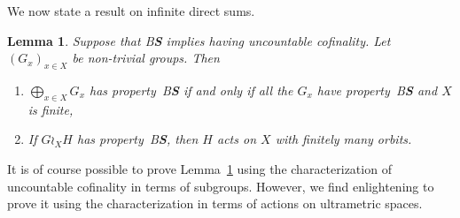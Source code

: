 \documentclass[a4paper]{article}
\newtheorem{lem}{Lemma}[section]
\theoremstyle{definition}
\newcommand*{\BS}{B\textbf{S}}
\begin{document}
We now state a result on infinite direct sums.
%
%
\begin{lem}\label{Lemma:Cof}
Suppose that \BS{} implies having uncountable cofinality.
Let $(G_x)_{x\in X}$ be non-trivial groups. Then
\begin{enumerate}
\item $\bigoplus_{x\in X}G_x$ has property~\BS{} if and only if all the $G_x$ have property~\BS{} and $X$ is finite,
\item If $G\wr_XH$ has property~\BS, then $H$ acts on $X$ with finitely many orbits.
\end{enumerate}
\end{lem}
%
%
It is of course possible to prove Lemma~\ref{Lemma:Cof} using the characterization of uncountable cofinality in terms of subgroups. However, we find enlightening to prove it using the characterization in terms of actions on ultrametric spaces.
%
%
\end{document}
